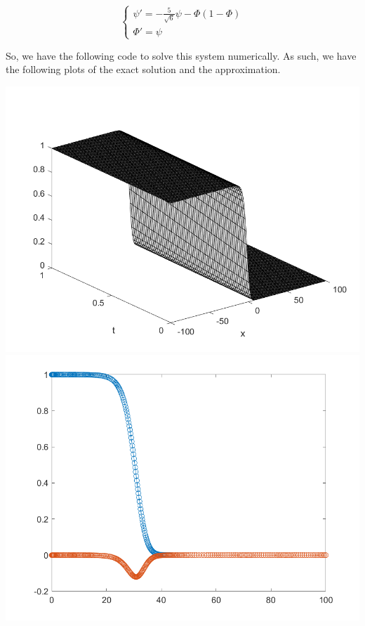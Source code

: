 \begin{solution}
     $$\begin{cases}
        \psi' = -\frac{5}{\sqrt6}\psi - \Phi(1-\Phi) \\
        \Phi' = \psi
    \end{cases}$$

    So, we have the following code to solve this system numerically. As such, we have the following
    plots of the exact solution and the approximation.

    \begin{center}
        \includegraphics[scale=0.5]{problem2i1.PNG}
        \includegraphics[scale=0.5]{problem2i2.PNG}
    \end{center}

\end{solution}

\newpage

\newpage
